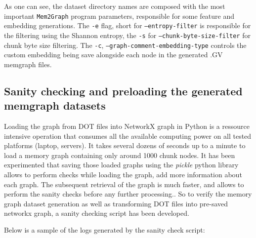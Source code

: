 As one can see, the dataset directory names are composed with the most important \texttt{Mem2Graph} program parameters, responsible for some feature and embedding generations. The \texttt{-e} flag, short for \texttt{--entropy-filter} is responsible for the filtering using the Shannon entropy, the \texttt{-s} for \texttt{--chunk-byte-size-filter} for chunk byte size filtering. The \texttt{-c}, \texttt{--graph-comment-embedding-type} controls the custom embedding being save alongside each node in the generated .GV memgraph files.

\subsection{Sanity checking and preloading the generated memgraph datasets}
Loading the graph from DOT files into NetworkX graph in Python is a ressource intensive operation that consumes all the available computing power on all tested platforms (laptop, servers). It takes several dozens of seconds up to a minute to load a memory graph containing only around 1000 chunk nodes. It has been experimented that saving those loaded graphs using the \textit{pickle} python library allows to perform checks while loading the graph, add more information about each graph. The subsequent retrieval of the graph is much faster, and allows to perform the sanity checks before any further processing.. So to verify the memory graph dataset generation as well as transforming DOT files into pre-saved networkx graph, a sanity checking script has been developed.

Below is a sample of the logs generated by the sanity check script:

